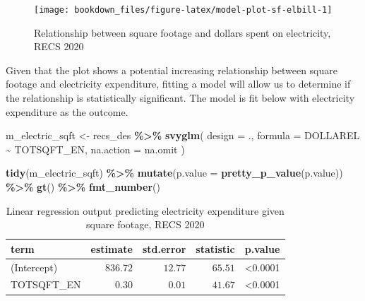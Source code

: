 \documentclass[
]{krantz}
\makeatletter
\newenvironment{Shaded}{\begin{snugshade}}{\end{snugshade}}
\newcommand{\AttributeTok}[1]{\textcolor[rgb]{0.27,0.27,0.27}{#1}}
\newcommand{\FunctionTok}[1]{\textcolor[rgb]{0.27,0.27,0.27}{\textbf{#1}}}
\newcommand{\NormalTok}[1]{#1}
\newcommand{\OtherTok}[1]{\textcolor[rgb]{0.37,0.37,0.37}{#1}}
\newcommand{\SpecialCharTok}[1]{\textcolor[rgb]{0.43,0.43,0.43}{\textbf{#1}}}
\newenvironment{kframe}{%
\medskip{}
\setlength{\fboxsep}{.8em}
 \def\at@end@of@kframe{}%
 \ifinner\ifhmode%
  \def\at@end@of@kframe{\end{minipage}}%
  \begin{minipage}{\columnwidth}%
 \fi\fi%
 \def\FrameCommand##1{\hskip\@totalleftmargin \hskip-\fboxsep
 \colorbox{shadecolor}{##1}\hskip-\fboxsep
     \hskip-\linewidth \hskip-\@totalleftmargin \hskip\columnwidth}%
 \MakeFramed {\advance\hsize-\width
   \@totalleftmargin\z@ \linewidth\hsize
   \@setminipage}}%
 {\par\unskip\endMakeFramed%
 \at@end@of@kframe}
\renewenvironment{Shaded}{\begin{kframe}}{\end{kframe}}
\makeatother
\begin{document}
\begin{figure}
\texttt{[image: bookdown\_files/figure-latex/model-plot-sf-elbill-1]} \caption{Relationship between square footage and dollars spent on electricity, RECS 2020}\label{fig:model-plot-sf-elbill}
\end{figure}

Given that the plot shows a potential increasing relationship between square footage and electricity expenditure, fitting a model will allow us to determine if the relationship is statistically significant. The model is fit below with electricity expenditure as the outcome.

\begin{Shaded}
\begin{Highlighting}[]
\NormalTok{m\_electric\_sqft }\OtherTok{\textless{}{-}}\NormalTok{ recs\_des }\SpecialCharTok{\%\textgreater{}\%}
  \FunctionTok{svyglm}\NormalTok{(}
    \AttributeTok{design =}\NormalTok{ .,}
    \AttributeTok{formula =}\NormalTok{ DOLLAREL }\SpecialCharTok{\textasciitilde{}}\NormalTok{ TOTSQFT\_EN,}
    \AttributeTok{na.action =}\NormalTok{ na.omit}
\NormalTok{  )}
\end{Highlighting}
\end{Shaded}

\begin{Shaded}
\begin{Highlighting}[]
\FunctionTok{tidy}\NormalTok{(m\_electric\_sqft) }\SpecialCharTok{\%\textgreater{}\%}
  \FunctionTok{mutate}\NormalTok{(}\AttributeTok{p.value =} \FunctionTok{pretty\_p\_value}\NormalTok{(p.value)) }\SpecialCharTok{\%\textgreater{}\%}
  \FunctionTok{gt}\NormalTok{() }\SpecialCharTok{\%\textgreater{}\%}
  \FunctionTok{fmt\_number}\NormalTok{()}
\end{Highlighting}
\end{Shaded}



\begin{longtable}{lrrrl}
\caption{\label{tab:model-slr-examp-tab}Linear regression output predicting electricity expenditure given square footage, RECS 2020}\\
\toprule
term & estimate & std.error & statistic & p.value \\ 
\midrule\relax
(Intercept) & $836.72$ & $12.77$ & $65.51$ & <0.0001 \\ 
TOTSQFT\_EN & $0.30$ & $0.01$ & $41.67$ & <0.0001 \\ 
\bottomrule
\end{longtable}
\end{document}
